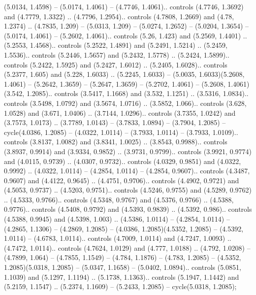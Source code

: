 (5.0134, 1.4598) -- (5.0174, 1.4061) -- (4.7746, 1.4061).. controls (4.7746, 1.3692) and (4.7779, 1.3322) .. (4.7796, 1.2954).. controls (4.7808, 1.2669) and (4.78, 1.2374) .. (4.7835, 1.209) -- (5.0313, 1.209) -- (5.0274, 1.2652) -- (5.0204, 1.3654) -- (5.0174, 1.4061) -- (5.2602, 1.4061).. controls (5.26, 1.423) and (5.2569, 1.4401) .. (5.2553, 1.4568).. controls (5.2522, 1.4891) and (5.2491, 1.5214) .. (5.2459, 1.5536).. controls (5.2446, 1.5657) and (5.2432, 1.5778) .. (5.2424, 1.5899).. controls (5.2422, 1.5925) and (5.2427, 1.6012) .. (5.2405, 1.6028).. controls (5.2377, 1.605) and (5.228, 1.6033) .. (5.2245, 1.6033) -- (5.0035, 1.6033)(5.2608, 1.4061) -- (5.2642, 1.3659) -- (5.2647, 1.3659) -- (5.2702, 1.4061) -- (5.2608, 1.4061)(3.542, 1.2085).. controls (3.5417, 1.1668) and (3.532, 1.1251) .. (3.5316, 1.0834).. controls (3.5498, 1.0792) and (3.5674, 1.0716) .. (3.5852, 1.066).. controls (3.628, 1.0528) and (3.671, 1.0406) .. (3.7144, 1.0296).. controls (3.7355, 1.0242) and (3.7573, 1.0173) .. (3.7789, 1.0143) -- (3.7833, 1.0894) -- (3.7904, 1.2085) -- cycle(4.0386, 1.2085) -- (4.0322, 1.0114) -- (3.7933, 1.0114) -- (3.7933, 1.0109).. controls (3.8137, 1.0082) and (3.8341, 1.0025) .. (3.8543, 0.9988).. controls (3.8937, 0.9914) and (3.9334, 0.9852) .. (3.9731, 0.9799).. controls (3.9921, 0.9774) and (4.0115, 0.9739) .. (4.0307, 0.9732).. controls (4.0329, 0.9851) and (4.0322, 0.9992) .. (4.0322, 1.0114) -- (4.2854, 1.0114) -- (4.2854, 0.9607).. controls (4.3487, 0.9607) and (4.4122, 0.9645) .. (4.4751, 0.9706).. controls (4.4902, 0.9721) and (4.5053, 0.9737) .. (4.5203, 0.9751).. controls (4.5246, 0.9755) and (4.5289, 0.9762) .. (4.5333, 0.9766).. controls (4.5348, 0.9767) and (4.5376, 0.9766) .. (4.5388, 0.9776).. controls (4.5408, 0.9792) and (4.5393, 0.9839) .. (4.5392, 0.986).. controls (4.5388, 0.9945) and (4.5398, 1.003) .. (4.5386, 1.0114) -- (4.2854, 1.0114) -- (4.2865, 1.1306) -- (4.2869, 1.2085) -- (4.0386, 1.2085)(4.5352, 1.2085) -- (4.5392, 1.0114) -- (4.6783, 1.0114).. controls (4.7009, 1.0114) and (4.7247, 1.0093) .. (4.7472, 1.0114).. controls (4.7624, 1.0129) and (4.777, 1.0188) .. (4.792, 1.0208) -- (4.7899, 1.064) -- (4.7855, 1.1549) -- (4.784, 1.1876) -- (4.783, 1.2085) -- (4.5352, 1.2085)(5.0318, 1.2085) -- (5.0347, 1.1658) -- (5.0402, 1.0894).. controls (5.0851, 1.1039) and (5.1297, 1.1194) .. (5.1738, 1.1363).. controls (5.1947, 1.1442) and (5.2159, 1.1547) .. (5.2374, 1.1609) -- (5.2433, 1.2085) -- cycle(5.0318, 1.2085);



